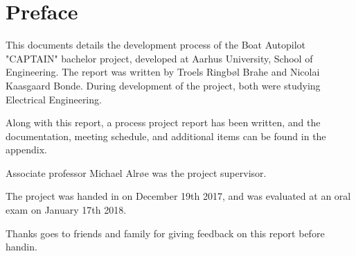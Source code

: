 \newpage
\chapter{Preface}
This documents details the development process of the Boat Autopilot "CAPTAIN" bachelor project, developed at Aarhus University, School of Engineering. The report was written by Troels Ringbøl Brahe and Nicolai Kaasgaard Bonde. During development of the project, both were studying Electrical Engineering.

Along with this report, a process project report has been written, and the documentation, meeting schedule, and additional items can be found in the appendix.

Associate professor Michael Alrøe was the project supervisor.

The project was handed in on December 19th 2017, and was evaluated at an oral exam on January 17th 2018.

Thanks goes to friends and family for giving feedback on this report before handin.